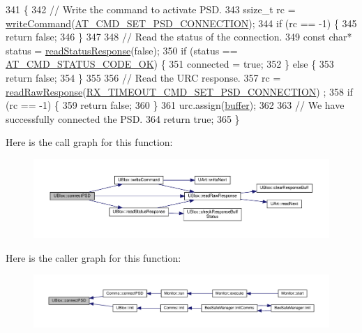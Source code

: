 \begin{DoxyCode}
341 \{
342     \textcolor{comment}{// Write the command to activate PSD.}
343     ssize\_t rc = \hyperlink{class_u_blox_af604d1897a66192bf1c2a11997f2634d}{writeCommand}(\hyperlink{_u_blox_8cpp_a4a218a894fbc18e33dcf027485c060cb}{AT\_CMD\_SET\_PSD\_CONNECTION});
344     \textcolor{keywordflow}{if} (rc == -1) \{
345         \textcolor{keywordflow}{return} \textcolor{keyword}{false};
346     \}
347 
348     \textcolor{comment}{// Read the status of the connection.}
349     \textcolor{keyword}{const} \textcolor{keywordtype}{char}* status = \hyperlink{class_u_blox_a4eaca5b1b1c4b5b6f6164b220dd43e0b}{readStatusResponse}(\textcolor{keyword}{false});
350     \textcolor{keywordflow}{if} (status == \hyperlink{_u_blox_8cpp_a6ebc1682eb6b9964fccb4a61688ff307}{AT\_CMD\_STATUS\_CODE\_OK}) \{
351         connected = \textcolor{keyword}{true};
352     \} \textcolor{keywordflow}{else} \{
353         \textcolor{keywordflow}{return} \textcolor{keyword}{false};
354     \}
355 
356     \textcolor{comment}{// Read the URC response.}
357     rc = \hyperlink{class_u_blox_ab4a7ab4b8922d91e23f273ae160c1bed}{readRawResponse}(\hyperlink{_u_blox_8cpp_a9acf8a3c149e89cfa0d456905a07a50b}{RX\_TIMEOUT\_CMD\_SET\_PSD\_CONNECTION})
      ;
358     \textcolor{keywordflow}{if} (rc == -1) \{
359         \textcolor{keywordflow}{return} \textcolor{keyword}{false};
360     \}
361     urc.assign(\hyperlink{class_u_blox_a6ca4b90f3dc4e856181dce1ebda6f82c}{buffer});
362 
363     \textcolor{comment}{// We have successfully connected the PSD.}
364     \textcolor{keywordflow}{return} \textcolor{keyword}{true};
365 \}
\end{DoxyCode}
Here is the call graph for this function\+:\nopagebreak
\begin{figure}[H]
\begin{center}
\leavevmode
\includegraphics[width=350pt]{da/df6/class_u_blox_ac250bd4aea14e09b3a2595c2b8eda18a_cgraph}
\end{center}
\end{figure}
Here is the caller graph for this function\+:\nopagebreak
\begin{figure}[H]
\begin{center}
\leavevmode
\includegraphics[width=350pt]{da/df6/class_u_blox_ac250bd4aea14e09b3a2595c2b8eda18a_icgraph}
\end{center}
\end{figure}
\mbox{\label{class_u_blox_ade30654ab2eab43d322dc6b516866401}} 

